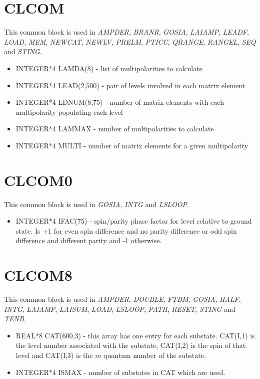\section{CLCOM}

This common block is used in {\em AMPDER}, {\em BRANR}, {\em GOSIA}, {\em
LAIAMP}, {\em LEADF}, {\em LOAD}, {\em MEM}, {\em NEWCAT}, {\em NEWLV}, {\em
PRELM}, {\em PTICC}, {\em QRANGE}, {\em RANGEL}, {\em SEQ} and {\em STING}.

\begin{itemize}
\item INTEGER*4 LAMDA(8) - list of multipolarities to calculate
\item INTEGER*4 LEAD(2,500) - pair of levels involved in each matrix element
\item INTEGER*4 LDNUM(8,75) - number of matrix elements with each multipolarity populating each level
\item INTEGER*4 LAMMAX - number of multipolarities to calculate
\item INTEGER*4 MULTI - number of matrix elements for a given multipolarity
\end{itemize}

\section{CLCOM0}

This common block is used in {\em GOSIA}, {\em INTG} and {\em LSLOOP}.

\begin{itemize}
\item INTEGER*4 IFAC(75) - spin/parity phase factor for level relative to
ground state. Is +1 for even spin difference and no parity difference or odd
spin difference and different parity and -1 otherwise.
\end{itemize}

\section{CLCOM8}

This common block is used in {\em AMPDER}, {\em DOUBLE}, {\em FTBM}, {\em
GOSIA}, {\em HALF}, {\em INTG}, {\em LAIAMP}, {\em LAISUM}, {\em LOAD}, {\em
LSLOOP}, {\em PATH}, {\em RESET}, {\em STING} and {\em TENB}.

\begin{itemize}
\item REAL*8 CAT(600,3) - this array has one entry for each substate.
CAT(I,1) is the level number associated with the substate, CAT(I,2) is the
spin of that level and CAT(I,3) is the $m$ quantum number of the substate.
\item INTEGER*4 ISMAX - number of substates in CAT which are used.
\end{itemize}

